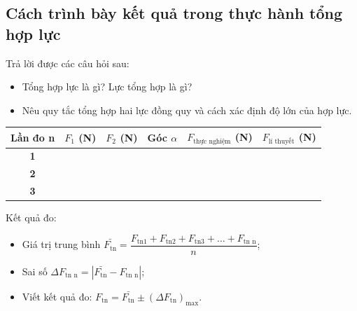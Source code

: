 \subsection{Cách trình bày kết quả trong thực hành tổng hợp lực}
Trả lời được các câu hỏi sau:
\begin{itemize}
	\item Tổng hợp lực là gì? Lực tổng hợp là gì?
	\item Nêu quy tắc tổng hợp hai lực đồng quy và cách xác định độ lớn của hợp lực.
\end{itemize}
\begin{center}
	\begin{table}[]
		\begin{tabular}{|c|l|l|l|l|l|}
			\hline
			\textbf{Lần đo n} & \multicolumn{1}{c|}{\textbf{$F_1$ (N)}} & \multicolumn{1}{c|}{\textbf{$F_2$ (N)}} & \multicolumn{1}{c|}{\textbf{Góc $\alpha$}} & \multicolumn{1}{c|}{$F_\text{thực nghiệm}$ (N)} & \multicolumn{1}{c|}{$F_\text{lí thuyết}$ (N)} \\ \hline
			\textbf{1}        & \multicolumn{1}{c|}{}                   & \multicolumn{1}{c|}{}                   & \multicolumn{1}{c|}{}                      &                                                                              &                                                                            \\ \hline
			\textbf{2}        &                                         &                                         &                                            &                                                                              &                                                                            \\ \hline
			\textbf{3}        &                                         &                                         &                                            &                                                                              &                                                                            \\ \hline
		\end{tabular}
	\end{table}
\end{center}
Kết quả đo:
\begin{itemize}
	\item Giá trị trung bình $\bar{F_\text{tn}} = \dfrac{F_{\text{tn1}} + F_{\text{tn2}} + F_{\text{tn3}} + \ldots + F_{\text{tn n}}}{n}$;
	\item Sai số $\Delta F_{\text{tn n}} = |\bar{F_{\text{tn}}} - F_{\text{tn n}}|$;
	\item Viết kết quả đo: $F_{\text{tn}}=\bar{F_{\text{tn}}} \pm (\Delta F_{\text{tn}})_\text{max}$.
\end{itemize}
